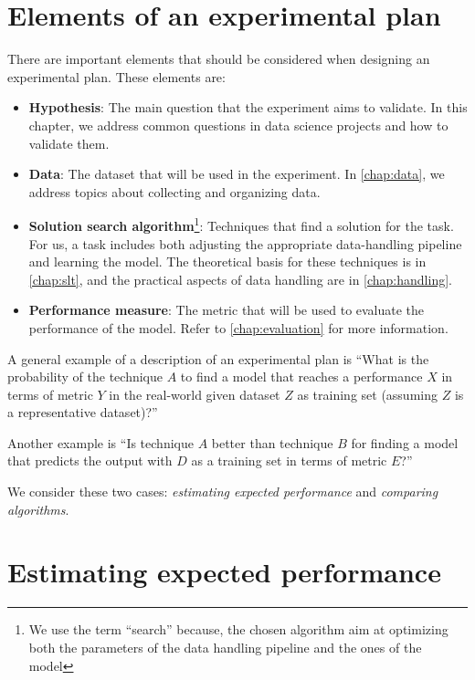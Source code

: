 {}
\clearpage



\section{Elements of an experimental plan}

There are important elements that should be considered when designing an experimental
plan.  These elements are:
\begin{itemize}
  \item \textbf{Hypothesis}: The main question that the experiment aims to validate.
    In this chapter, we address common questions in data science projects and how to
    validate them.
  \item \textbf{Data}: The dataset that will be used in the experiment.  In
    \cref{chap:data}, we address topics about collecting and organizing data.
  \item \textbf{Solution search algorithm}\footnote{We use the term ``search'' because,
    the chosen algorithm aim at optimizing both the parameters of the data handling
    pipeline and the ones of the model}: Techniques that find a solution for the task.
    For us, a task includes both adjusting the appropriate data-handling
    pipeline and learning the model.  The theoretical basis for these techniques is in
    \cref{chap:slt}, and the practical aspects of data handling are in \cref{chap:handling}.
  \item \textbf{Performance measure}: The metric that will be used to evaluate the
    performance of the model.  Refer to \cref{chap:evaluation} for more information.
\end{itemize}

A general example of a description of an experimental plan is ``What is the probability of
the technique $A$ to find a model that reaches a performance $X$ in terms of metric $Y$ in
the real-world given dataset $Z$ as training set (assuming $Z$ is a representative
dataset)?''

Another example is ``Is technique $A$ better than technique $B$ for finding a model that
predicts the output with $D$ as a training set in terms of metric $E$?''

We consider these two cases: \emph{estimating expected performance} and \emph{comparing
algorithms}.

\section{Estimating expected performance}
\label{sec:expected-performance}

